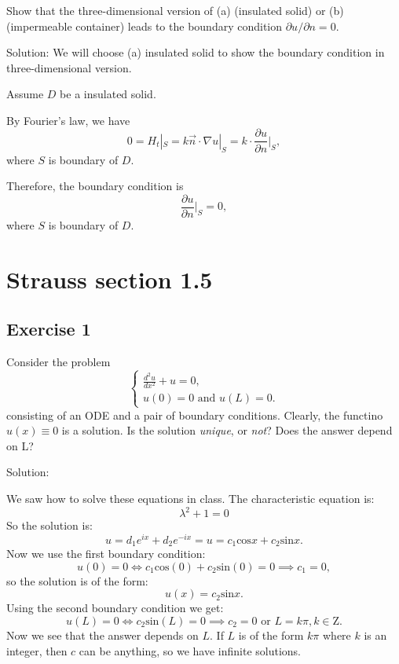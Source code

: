\documentclass{article}
\begin{document}
	\subsubsection{}
Show that the three-dimensional version of (a) (insulated solid) or (b) (impermeable container) leads to the boundary condition $\partial u/ \partial n=0$.
		
		Solution: We will choose (a) insulated solid to show the boundary condition in three-dimensional version.
	    
		Assume $D$ be a insulated solid.
		 
		By Fourier's law, we have 
		 \[0= H_{t}|_{S}= k\vec{n}\cdot \nabla u |_{S}=k\cdot \frac{\partial u}{\partial n}|_{S}, \]
        where $S$ is boundary of $D$.

		Therefore, the boundary condition is \[ \frac{\partial u}{\partial n}|_{S}=0,\]
		where $S$ is boundary of $D$.

\section{Strauss section 1.5}
\subsection{Exercise 1}
Consider the problem
		\begin{equation*}
			\begin{cases}
				\frac{d^2u}{dx^2}+u = 0,
				\\
				u(0)=0 \text{ and } u(L)=0.
			\end{cases}
		\end{equation*}
		consisting of an ODE and a pair of boundary
		conditions. Clearly, the functino $u(x) \equiv 0$ is a
		solution. Is the solution \textit{unique}, or \textit{not}?
	Does the answer depend on L?

		Solution:

		We saw how to solve these equations in class.
		The characteristic equation is:
		\[
			\lambda^2 +1=0
		\]
		So the solution is:
\[u = d_1e^{ix} + d_2e^{-ix} =u = c_1\text{cos}x +	c_2\text{sin}x.\]
		Now we use the first boundary condition:
		\[
			u(0)=0 \iff c_1\text{cos}(0) +
			c_2\text{sin}(0) = 0 \implies c_1=0,
	        \]
		so the solution is of the form:
		\[
			u(x)=c_{2}\text{sin}x.
		\]
		Using the second boundary condition we get:
		\[
			u(L)=0 \iff c_{2}\text{sin}(L) =0 \implies c_{2}=0 \text{ or } L=k\pi, k\in \mathrm{Z}.
		\]
		Now we see that the answer depends on $L$. If $L$ is of the form $k\pi$ where $k$ is an integer, then $c$ can be anything, so we have infinite solutions.
\end{document}
